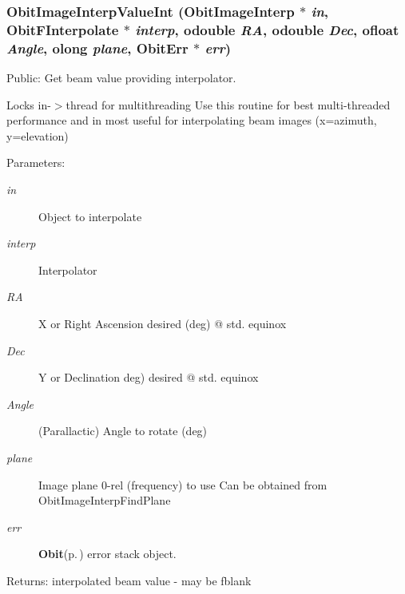 \subsubsection{ Obit\-Image\-Interp\-Value\-Int ({\bf Obit\-Image\-Interp} $\ast$ {\em in}, {\bf Obit\-FInterpolate} $\ast$ {\em interp}, {\bf odouble} {\em RA}, {\bf odouble} {\em Dec}, {\bf ofloat} {\em Angle}, {\bf olong} {\em plane}, {\bf Obit\-Err} $\ast$ {\em err})}\label{ObitImageInterp_8c_a13}


Public: Get beam value providing interpolator. 

Locks in-$>$thread for multithreading Use this routine for best multi-threaded performance and in most useful for interpolating beam images (x=azimuth, y=elevation) \begin{Desc}
\item[Parameters:]
\begin{description}
\item[{\em in}]Object to interpolate \item[{\em interp}]Interpolator \item[{\em RA}]X or Right Ascension desired (deg) @ std. equinox \item[{\em Dec}]Y or Declination deg) desired @ std. equinox \item[{\em Angle}](Parallactic) Angle to rotate (deg) \item[{\em plane}]Image plane 0-rel (frequency) to use Can be obtained from Obit\-Image\-Interp\-Find\-Plane \item[{\em err}]{\bf Obit}{\rm (p.\,\pageref{structObit})} error stack object. \end{description}
\end{Desc}
\begin{Desc}
\item[Returns:]interpolated beam value - may be fblank \end{Desc}
